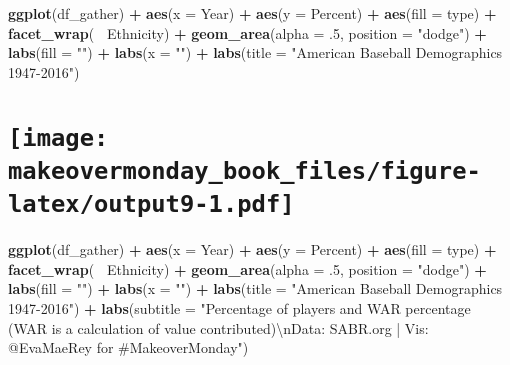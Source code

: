 \documentclass[]{book}
\newenvironment{Shaded}{\begin{snugshade}}{\end{snugshade}}
\newcommand{\KeywordTok}[1]{\textcolor[rgb]{0.13,0.29,0.53}{\textbf{#1}}}
\newcommand{\DataTypeTok}[1]{\textcolor[rgb]{0.13,0.29,0.53}{#1}}
\newcommand{\DecValTok}[1]{\textcolor[rgb]{0.00,0.00,0.81}{#1}}
\newcommand{\CharTok}[1]{\textcolor[rgb]{0.31,0.60,0.02}{#1}}
\newcommand{\StringTok}[1]{\textcolor[rgb]{0.31,0.60,0.02}{#1}}
\newcommand{\OperatorTok}[1]{\textcolor[rgb]{0.81,0.36,0.00}{\textbf{#1}}}
\newcommand{\NormalTok}[1]{#1}
\theoremstyle{definition}
\theoremstyle{definition}
\theoremstyle{definition}
\theoremstyle{remark}
\begin{document}
\clearpage

\begin{Shaded}
\begin{Highlighting}[]
\KeywordTok{ggplot}\NormalTok{(df_gather) }\OperatorTok{+}
\StringTok{  }\KeywordTok{aes}\NormalTok{(}\DataTypeTok{x =}\NormalTok{ Year) }\OperatorTok{+}
\StringTok{  }\KeywordTok{aes}\NormalTok{(}\DataTypeTok{y =}\NormalTok{ Percent) }\OperatorTok{+}
\StringTok{  }\KeywordTok{aes}\NormalTok{(}\DataTypeTok{fill =}\NormalTok{ type) }\OperatorTok{+}
\StringTok{  }\KeywordTok{facet_wrap}\NormalTok{(}\OperatorTok{~}\StringTok{ }\NormalTok{Ethnicity) }\OperatorTok{+}
\StringTok{  }\KeywordTok{geom_area}\NormalTok{(}\DataTypeTok{alpha =}\NormalTok{ .}\DecValTok{5}\NormalTok{, }\DataTypeTok{position =} \StringTok{"dodge"}\NormalTok{) }\OperatorTok{+}
\StringTok{  }\KeywordTok{labs}\NormalTok{(}\DataTypeTok{fill =} \StringTok{""}\NormalTok{) }\OperatorTok{+}
\StringTok{  }\KeywordTok{labs}\NormalTok{(}\DataTypeTok{x =} \StringTok{""}\NormalTok{) }\OperatorTok{+}
\StringTok{  }\KeywordTok{labs}\NormalTok{(}\DataTypeTok{title =} \StringTok{"American Baseball Demographics 1947-2016"}\NormalTok{) }
\end{Highlighting}
\end{Shaded}

\section[]{\texorpdfstring{\protect\texttt{[image: makeovermonday\_book\_files/figure-latex/output9-1.pdf]}}{}}\label{section-8}

\clearpage

\begin{Shaded}
\begin{Highlighting}[]
\KeywordTok{ggplot}\NormalTok{(df_gather) }\OperatorTok{+}
\StringTok{  }\KeywordTok{aes}\NormalTok{(}\DataTypeTok{x =}\NormalTok{ Year) }\OperatorTok{+}
\StringTok{  }\KeywordTok{aes}\NormalTok{(}\DataTypeTok{y =}\NormalTok{ Percent) }\OperatorTok{+}
\StringTok{  }\KeywordTok{aes}\NormalTok{(}\DataTypeTok{fill =}\NormalTok{ type) }\OperatorTok{+}
\StringTok{  }\KeywordTok{facet_wrap}\NormalTok{(}\OperatorTok{~}\StringTok{ }\NormalTok{Ethnicity) }\OperatorTok{+}
\StringTok{  }\KeywordTok{geom_area}\NormalTok{(}\DataTypeTok{alpha =}\NormalTok{ .}\DecValTok{5}\NormalTok{, }\DataTypeTok{position =} \StringTok{"dodge"}\NormalTok{) }\OperatorTok{+}
\StringTok{  }\KeywordTok{labs}\NormalTok{(}\DataTypeTok{fill =} \StringTok{""}\NormalTok{) }\OperatorTok{+}
\StringTok{  }\KeywordTok{labs}\NormalTok{(}\DataTypeTok{x =} \StringTok{""}\NormalTok{) }\OperatorTok{+}
\StringTok{  }\KeywordTok{labs}\NormalTok{(}\DataTypeTok{title =} \StringTok{"American Baseball Demographics 1947-2016"}\NormalTok{) }\OperatorTok{+}
\StringTok{  }\KeywordTok{labs}\NormalTok{(}\DataTypeTok{subtitle =} \StringTok{"Percentage of players and WAR percentage (WAR is a calculation of value contributed)}\CharTok{\textbackslash{}n}\StringTok{Data: SABR.org | Vis: @EvaMaeRey for #MakeoverMonday"}\NormalTok{) }
\end{Highlighting}
\end{Shaded}
\end{document}
